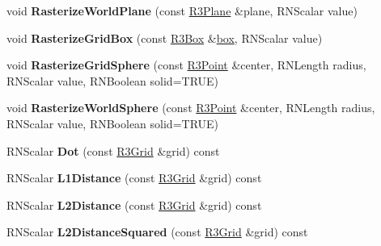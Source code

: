 \begin{DoxyCompactItemize}
\item 
void {\bfseries Rasterize\+World\+Plane} (const \hyperlink{class_r3_plane}{R3\+Plane} \&plane, R\+N\+Scalar value)\hypertarget{class_r3_grid_ae4770a88936465c7ca8332defbd270d3}{}\label{class_r3_grid_ae4770a88936465c7ca8332defbd270d3}

\item 
void {\bfseries Rasterize\+Grid\+Box} (const \hyperlink{class_r3_box}{R3\+Box} \&\hyperlink{structbox}{box}, R\+N\+Scalar value)\hypertarget{class_r3_grid_ad0ba50515cb15de7adb3230dbe69a826}{}\label{class_r3_grid_ad0ba50515cb15de7adb3230dbe69a826}

\item 
void {\bfseries Rasterize\+Grid\+Sphere} (const \hyperlink{class_r3_point}{R3\+Point} \&center, R\+N\+Length radius, R\+N\+Scalar value, R\+N\+Boolean solid=T\+R\+UE)\hypertarget{class_r3_grid_a235d6de345f6418a661fa91c0a4629c7}{}\label{class_r3_grid_a235d6de345f6418a661fa91c0a4629c7}

\item 
void {\bfseries Rasterize\+World\+Sphere} (const \hyperlink{class_r3_point}{R3\+Point} \&center, R\+N\+Length radius, R\+N\+Scalar value, R\+N\+Boolean solid=T\+R\+UE)\hypertarget{class_r3_grid_a9c3c9307e2db2691c4ac99737e2075c6}{}\label{class_r3_grid_a9c3c9307e2db2691c4ac99737e2075c6}

\item 
R\+N\+Scalar {\bfseries Dot} (const \hyperlink{class_r3_grid}{R3\+Grid} \&grid) const \hypertarget{class_r3_grid_ad845c9ba2b1b837b89b720f7ad26faa5}{}\label{class_r3_grid_ad845c9ba2b1b837b89b720f7ad26faa5}

\item 
R\+N\+Scalar {\bfseries L1\+Distance} (const \hyperlink{class_r3_grid}{R3\+Grid} \&grid) const \hypertarget{class_r3_grid_a6c7170e38acc95de9fee33cb2db6d999}{}\label{class_r3_grid_a6c7170e38acc95de9fee33cb2db6d999}

\item 
R\+N\+Scalar {\bfseries L2\+Distance} (const \hyperlink{class_r3_grid}{R3\+Grid} \&grid) const \hypertarget{class_r3_grid_ab1e3862bca605292523d3bd978a0ba00}{}\label{class_r3_grid_ab1e3862bca605292523d3bd978a0ba00}

\item 
R\+N\+Scalar {\bfseries L2\+Distance\+Squared} (const \hyperlink{class_r3_grid}{R3\+Grid} \&grid) const \hypertarget{class_r3_grid_a7d71b5d30f3dfd264a2db5de1dba7944}{}\label{class_r3_grid_a7d71b5d30f3dfd264a2db5de1dba7944}


\end{DoxyCompactItemize}
